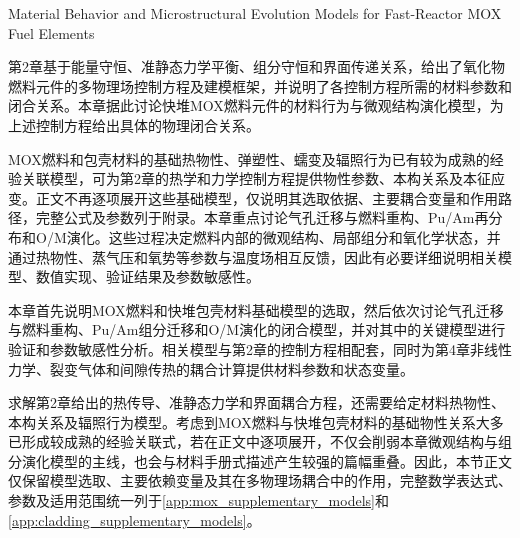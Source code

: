 

{Material Behavior and Microstructural Evolution Models for Fast-Reactor MOX Fuel Elements}
\label{chap:material_microstructure_models}

\label{sec:ch3_introduction}

第2章基于能量守恒、准静态力学平衡、组分守恒和界面传递关系，给出了氧化物燃料元件的多物理场控制方程及建模框架，并说明了各控制方程所需的材料参数和闭合关系。本章据此讨论快堆MOX燃料元件的材料行为与微观结构演化模型，为上述控制方程给出具体的物理闭合关系。

MOX燃料和包壳材料的基础热物性、弹塑性、蠕变及辐照行为已有较为成熟的经验关联模型，可为第2章的热学和力学控制方程提供物性参数、本构关系及本征应变。正文不再逐项展开这些基础模型，仅说明其选取依据、主要耦合变量和作用路径，完整公式及参数列于附录。本章重点讨论气孔迁移与燃料重构、Pu/Am再分布和O/M演化。这些过程决定燃料内部的微观结构、局部组分和氧化学状态，并通过热物性、蒸气压和氧势等参数与温度场相互反馈，因此有必要详细说明相关模型、数值实现、验证结果及参数敏感性。

本章首先说明MOX燃料和快堆包壳材料基础模型的选取，然后依次讨论气孔迁移与燃料重构、Pu/Am组分迁移和O/M演化的闭合模型，并对其中的关键模型进行验证和参数敏感性分析。相关模型与第2章的控制方程相配套，同时为第4章非线性力学、裂变气体和间隙传热的耦合计算提供材料参数和状态变量。

\label{sec:ch3_material_model_selection}

求解第2章给出的热传导、准静态力学和界面耦合方程，还需要给定材料热物性、本构关系及辐照行为模型。考虑到MOX燃料与快堆包壳材料的基础物性关系大多已形成较成熟的经验关联式，若在正文中逐项展开，不仅会削弱本章微观结构与组分演化模型的主线，也会与材料手册式描述产生较强的篇幅重叠。因此，本节正文仅保留模型选取、主要依赖变量及其在多物理场耦合中的作用，完整数学表达式、参数及适用范围统一列于\ref{app:mox_supplementary_models}和\ref{app:cladding_supplementary_models}。

\label{sec:mox_thermophysical_properties}

